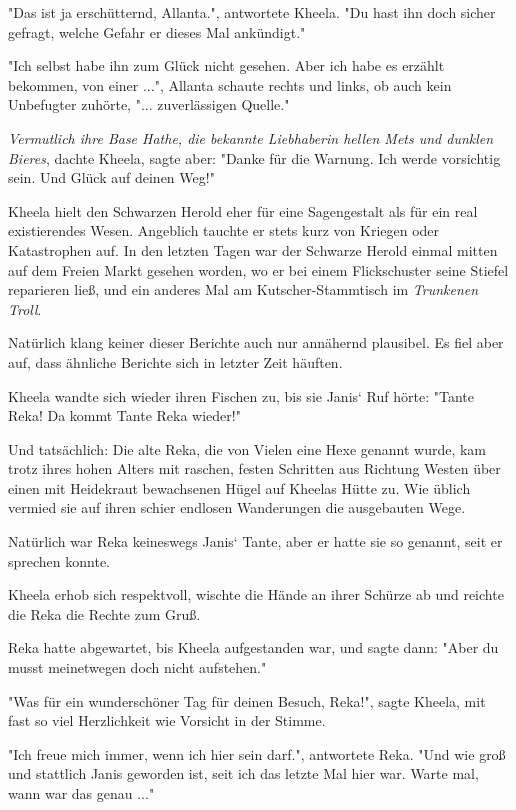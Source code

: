 \documentclass[10pt, a4paper, oneside]{book}
\begin{document}
\begin{multicols}{2}
"Das ist ja erschütternd, Allanta.", antwortete Kheela. "Du hast ihn doch sicher gefragt, welche Gefahr er dieses Mal ankündigt." 

"Ich selbst habe ihn zum Glück nicht gesehen. Aber ich habe es erzählt bekommen, von einer ...", Allanta schaute rechts und links, ob auch kein Unbefugter zuhörte, "... zuverlässigen Quelle." 

\textit{Vermutlich ihre Base Hathe, die bekannte Liebhaberin hellen Mets und dunklen Bieres}, dachte Kheela, sagte aber: "Danke für die Warnung. Ich werde vorsichtig sein. Und Glück auf deinen Weg!" 

Kheela hielt den Schwarzen Herold eher für eine Sagengestalt als für ein real existierendes Wesen. Angeblich tauchte er stets kurz von Kriegen oder Katastrophen auf. In den letzten Tagen war der Schwarze Herold einmal mitten auf dem Freien Markt gesehen worden, wo er bei einem Flickschuster seine Stiefel reparieren ließ, und ein anderes Mal am Kutscher-Stammtisch im \textit{Trunkenen Troll}. 

Natürlich klang keiner dieser Berichte auch nur annähernd plausibel. Es fiel aber auf, dass ähnliche Berichte sich in letzter Zeit häuften. 

Kheela wandte sich wieder ihren Fischen zu, bis sie Janis‘ Ruf hörte: "Tante Reka! Da kommt Tante Reka wieder!" 

Und tatsächlich: Die alte Reka, die von Vielen eine Hexe genannt wurde, kam trotz ihres hohen Alters mit raschen, festen Schritten aus Richtung Westen über einen mit Heidekraut bewachsenen Hügel auf Kheelas Hütte zu. Wie üblich vermied sie auf ihren schier endlosen Wanderungen die ausgebauten Wege. 

Natürlich war Reka keineswegs Janis‘ Tante, aber er hatte sie so genannt, seit er sprechen konnte. 

Kheela erhob sich respektvoll, wischte die Hände an ihrer Schürze ab und reichte die Reka die Rechte zum Gruß. 

Reka hatte abgewartet, bis Kheela aufgestanden war, und sagte dann: "Aber du musst meinetwegen doch nicht aufstehen." 

"Was für ein wunderschöner Tag für deinen Besuch, Reka!", sagte Kheela, mit fast so viel Herzlichkeit wie Vorsicht in der Stimme. 

"Ich freue mich immer, wenn ich hier sein darf.", antwortete Reka. "Und wie groß und stattlich Janis geworden ist, seit ich das letzte Mal hier war. Warte mal, wann war das genau ..." 


\end{multicols}
\end{document}
